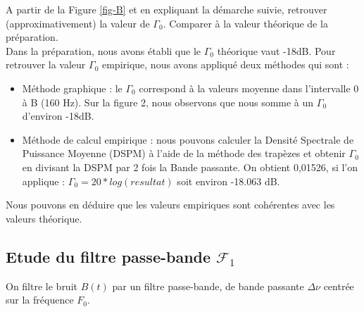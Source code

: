 \documentclass{article}
\begin{document}
A partir  de la Figure \ref{fig-B} et en expliquant la démarche suivie, retrouver (approximativement) la valeur de $\Gamma_0$. Comparer à la valeur théorique de la préparation.\\
\newline
Dans la préparation, nous avons établi que le $\Gamma_0$ théorique vaut -18dB. Pour retrouver la valeur $\Gamma_0$ empirique, nous avons appliqué deux méthodes qui sont : 
\begin{itemize}
    \item  Méthode graphique : le $\Gamma_0$ correspond à la valeurs moyenne dans l'intervalle 0 à B (160 Hz). Sur la figure 2, nous observons que nous somme à un $\Gamma_0$ d'environ -18dB. 
    \item  Méthode de calcul empirique : nous pouvons calculer la Densité Spectrale de Puissance Moyenne (DSPM) à l'aide de la méthode des trapèzes et obtenir $\Gamma_0$ en divisant la DSPM par 2 fois la Bande passante. On obtient 0,01526, si l'on applique : $\Gamma_0 = 20*log(resultat)$ soit environ -18.063 dB.  
\end{itemize}
Nous pouvons en déduire que les valeurs empiriques sont cohérentes avec les valeurs théorique.
\newpage

\subsection{Etude du filtre passe-bande $\mathcal{F}_1$}
\label{sec:bruit-passe-bande}

On filtre le bruit $B(t)$ par un filtre passe-bande, de bande passante  $\Delta\nu$ centrée sur  la fréquence  $F_0$. 

\subsubsection{}
\end{document}
